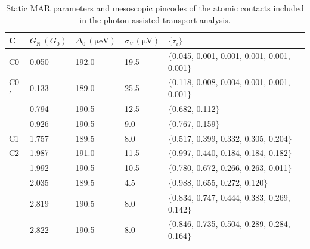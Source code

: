         \begin{table}[p]
            \centering
            \footnotesize
            \caption{Static MAR parameters and mesoscopic pincodes of the atomic contacts included in the photon assisted transport analysis.}
            \label{table:ac:pincodes}
            \vspace{1em}
            \begin{tabular}{l|l|l|l|l}
                C & $G_\mathrm{N}\,(G_0)$ & $\Delta_0\,(\unit{\micro\electronvolt})$ & $\sigma_V\,(\unit{\micro\volt})$ & $\{\tau_i\}$ \\\hline
                C0  & 0.050 & 192.0 & 19.5 & $\{$0.045, 0.001, 0.001, 0.001, 0.001, 0.001$\}$ \\ %
                C0$'$ & 0.133 & 189.0 & 25.5 & $\{$0.118, 0.008, 0.004, 0.001, 0.001, 0.001$\}$ \\ %
                    & 0.794 & 190.5 & 12.5 & $\{$0.682, 0.112$\}$\\ %
                    & 0.926 & 190.5 &  9.0 & $\{$0.767, 0.159$\}$\\ %
                C1  & 1.757 & 189.5 &  8.0 & $\{$0.517, 0.399, 0.332, 0.305, 0.204$\}$\\ %
                C2  & 1.987 & 191.0 & 11.5 & $\{$0.997, 0.440, 0.184, 0.184, 0.182$\}$ \\ %
                    & 1.992 & 190.5 & 10.5 & $\{$0.780, 0.672, 0.266, 0.263, 0.011$\}$ \\ %
                    & 2.035 & 189.5 &  4.5 & $\{$0.988, 0.655, 0.272, 0.120$\}$\\ %
                    & 2.819 & 190.5 &  8.0 & $\{$0.834, 0.747, 0.444, 0.383, 0.269, 0.142$\}$ \\ %
                    & 2.822 & 190.5 &  8.0 & $\{$0.846, 0.735, 0.504, 0.289, 0.284, 0.164$\}$ \\ %
            \end{tabular}

            \vspace{5em}
            

\end{table}
